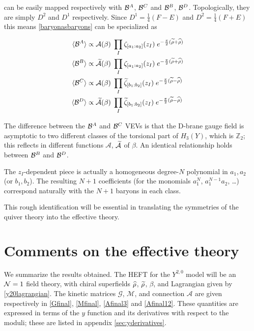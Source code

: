 can be easily mapped respectively with $\mathcal{B}^A$, $\mathcal{B}^C$ and $\mathcal{B}^B$, $\mathcal{B}^D$. Topologically, they are simply $D^2$ and $D^1$ respectively. Since $D^1 = \frac{1}{4}(F-E)$ and $D^2 = \frac{1}{4}(F+E)$ this means \eqref{baryonasbaryons} can be specialized as

\begin{align}
	\langle\mathcal{B}^A\rangle &\propto \mathcal{A}(\beta)\; \prod_I \zeta_{[a_1:a_2]} (z_I) \; e^{-\frac{\pi}{2} (\widetilde{\rho} + \widehat{\rho})}\\
	\langle\mathcal{B}^B\rangle &\propto \widetilde{\mathcal{A}}(\beta)\; \prod_I \zeta_{[a_1:a_2]} (z_I) \; e^{-\frac{\pi}{2} (\widetilde{\rho} + \widehat{\rho})}\\
	\langle\mathcal{B}^C\rangle &\propto \mathcal{A}(\beta)\; \prod_I \widetilde{\zeta}_{[b_1:b_2]} (z_I) \; e^{-\frac{\pi}{2} (\widetilde{\rho} - \widehat{\rho})}\\
	\langle\mathcal{B}^D\rangle &\propto \widetilde{\mathcal{A}}(\beta)\; \prod_I \widetilde{\zeta}_{[b_1:b_2]} (z_I) \; e^{-\frac{\pi}{2} (\widetilde{\rho} - \widehat{\rho})}
\end{align}

The difference between the $\mathcal{B}^A$ and $\mathcal{B}^C$ VEVs is that the D-brane gauge field is asymptotic to two different classes of the torsional part of $H_3(Y)$, which is $\mathbb{Z}_2$; this reflects in different functions $\mathcal{A}$, $\widetilde{\mathcal{A}}$ of $\beta$. An identical relationship holds between $\mathcal{B}^B$ and $\mathcal{B}^D$. 

The $z_I$-dependent piece is actually a homogeneous degree-$N$ polynomial in $a_1,a_2$ (or $b_1,b_2$). The resulting $N+1$ coefficients (for the monomials $a_1^N$, $a_1^{N-1} a_2$, \ldots) correspond naturally with the $N+1$ baryons in each class.

This rough identification will be essential in translating the symmetries of the quiver theory into the effective theory.

\section{Comments on the effective theory}

We summarize the results obtained. The HEFT for the $Y^{2,0}$ model will be an $\mathcal{N} = 1$ field theory, with chiral superfields $\widehat{\rho}$, $\widetilde{\rho}$, $\beta$, and Lagrangian given by \eqref{y20lagrangian}. The kinetic matrices $\mathcal{G}$, $\mathcal{M}$, and connection $\mathcal{A}$ are given respectively in \eqref{Gfinal}, \eqref{Mfinal}, \eqref{Afinal3} and \eqref{Afinal12}. These quantities are expressed in terms of the $y$ function and its derivatives with respect to the moduli; these are listed in appendix \ref{sec:yderivatives}.


